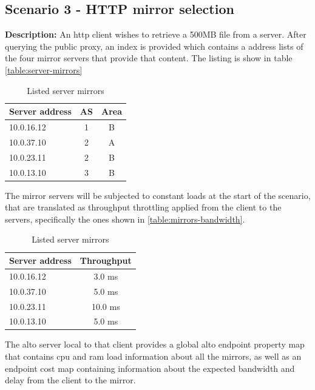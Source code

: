 \subsection{Scenario 3 - HTTP mirror selection}

\textbf{Description:} An \gls{http} client wishes to retrieve a 500MB file from a server.
After querying the public proxy, an index is provided which contains a address lists of the four mirror servers that provide that content.
The listing is show in table \ref{table:server-mirrors}

\begin{table}[H]
\centering
\begin{tabular}{|l|c|c|}
    \hline
    \textbf{Server address} & \textbf{AS} & \textbf{Area} \\ \hline
    10.0.16.12              & 1           & B             \\ \hline
    10.0.37.10              & 2           & A             \\ \hline
    10.0.23.11              & 2           & B             \\ \hline
    10.0.13.10              & 3           & B             \\ \hline
\end{tabular}
\caption{Listed server mirrors}
\label{tabel:server-mirrors}
\end{table}

The mirror servers will be subjected to constant loads at the start of the scenario, that are translated as throughput throttling applied from the client to the servers, specifically the ones shown in \ref{table:mirrors-bandwidth}.

\begin{table}[H]
\centering
\begin{tabular}{|l|c|}
    \hline
    \textbf{Server address} & \textbf{Throughput} \\ \hline
    10.0.16.12              & 3.0  ms             \\ \hline
    10.0.37.10              & 5.0  ms             \\ \hline
    10.0.23.11              & 10.0 ms             \\ \hline
    10.0.13.10              & 5.0  ms             \\ \hline
\end{tabular}
\caption{Listed server mirrors}
\label{tabel:server-mirrors}
\end{table}

The \gls{alto} server local to that client provides a global \gls{alto} endpoint property map that contains \gls{cpu} and \gls{ram} load information about all the mirrors, as well as an endpoint cost map containing information about the expected bandwidth and delay from the client to the mirror.

